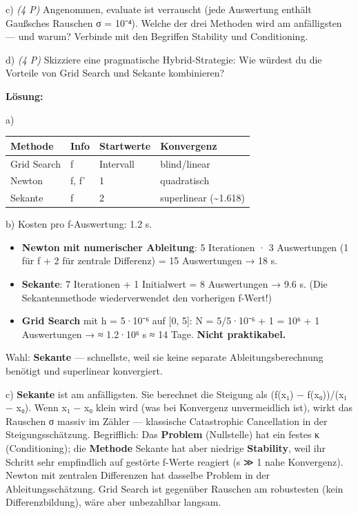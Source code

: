 \documentclass[11pt, a4paper]{article}
\begin{document}
c) \textit{(4 P)} Angenommen, evaluate ist verrauscht (jede Auswertung enthält Gaußsches Rauschen σ = 10⁻⁴). Welche der drei Methoden wird am anfälligsten — und warum? Verbinde mit den Begriffen Stability und Conditioning.


d) \textit{(4 P)} Skizziere eine pragmatische Hybrid-Strategie: Wie würdest du die Vorteile von Grid Search und Sekante kombinieren?


\textbf{Lösung:}


a)



{\small
\begin{tabularx}{\linewidth}{XXXX}
\hline
\rowcolor{tableheadbg}
{\color{white}\textbf{Methode}} & {\color{white}\textbf{Info}} & {\color{white}\textbf{Startwerte}} & {\color{white}\textbf{Konvergenz}} \\[2pt]
\hline
\endhead
\hline
\endfoot
Grid Search & f & Intervall & blind/linear \\
Newton & f, f' & 1 & quadratisch \\
Sekante & f & 2 & superlinear (\textasciitilde{}1.618) \\
\end{tabularx}
}


b) Kosten pro f-Auswertung: 1.2 s.

\begin{itemize}
  \item \textbf{Newton mit numerischer Ableitung}: 5 Iterationen · 3 Auswertungen (1 für f + 2 für zentrale Differenz) = 15 Auswertungen → 18 s.
  \item \textbf{Sekante}: 7 Iterationen + 1 Initialwert = 8 Auswertungen → 9.6 s. (Die Sekantenmethode wiederverwendet den vorherigen f-Wert!)
  \item \textbf{Grid Search} mit h = 5·10⁻⁶ auf [0, 5]: N = 5/5·10⁻⁶ + 1 = 10⁶ + 1 Auswertungen → ≈ 1.2·10⁶ s ≈ 14 Tage. \textbf{Nicht praktikabel.}
\end{itemize}

Wahl: \textbf{Sekante} — schnellste, weil sie keine separate Ableitungsberechnung benötigt und superlinear konvergiert.


c) \textbf{Sekante} ist am anfälligsten. Sie berechnet die Steigung als (f(x₁) − f(x₀))/(x₁ − x₀). Wenn x₁ − x₀ klein wird (was bei Konvergenz unvermeidlich ist), wirkt das Rauschen σ massiv im Zähler — klassische Catastrophic Cancellation in der Steigungsschätzung. Begrifflich: Das \textbf{Problem} (Nullstelle) hat ein festes κ (Conditioning); die \textbf{Methode} Sekante hat aber niedrige \textbf{Stability}, weil ihr Schritt sehr empfindlich auf gestörte f-Werte reagiert (s ≫ 1 nahe Konvergenz). Newton mit zentralen Differenzen hat dasselbe Problem in der Ableitungsschätzung. Grid Search ist gegenüber Rauschen am robustesten (kein Differenzbildung), wäre aber unbezahlbar langsam.
\end{document}
